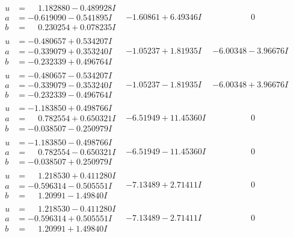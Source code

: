 \documentclass[1p]{elsarticle_modified}
\theoremstyle{definition}
\begin{document}
$$\begin{array}{c|c|c}
\begin{aligned}
u &= \phantom{-}1.182880 - 0.489928 I \\
a &= -0.619090 - 0.541895 I \\
b &= \phantom{-}0.230254 + 0.078235 I\end{aligned}
 & -1.60861 + 6.49346 I & \phantom{-0.000000 } 0 \\ \hline\begin{aligned}
u &= -0.480657 + 0.534207 I \\
a &= -0.339079 + 0.353240 I \\
b &= -0.232339 + 0.496764 I\end{aligned}
 & -1.05237 + 1.81935 I & -6.00348 - 3.96676 I \\ \hline\begin{aligned}
u &= -0.480657 - 0.534207 I \\
a &= -0.339079 - 0.353240 I \\
b &= -0.232339 - 0.496764 I\end{aligned}
 & -1.05237 - 1.81935 I & -6.00348 + 3.96676 I \\ \hline\begin{aligned}
u &= -1.183850 + 0.498766 I \\
a &= \phantom{-}0.782554 + 0.650321 I \\
b &= -0.038507 - 0.250979 I\end{aligned}
 & -6.51949 + 11.45360 I & \phantom{-0.000000 } 0 \\ \hline\begin{aligned}
u &= -1.183850 - 0.498766 I \\
a &= \phantom{-}0.782554 - 0.650321 I \\
b &= -0.038507 + 0.250979 I\end{aligned}
 & -6.51949 - 11.45360 I & \phantom{-0.000000 } 0 \\ \hline\begin{aligned}
u &= \phantom{-}1.218530 + 0.411280 I \\
a &= -0.596314 - 0.505551 I \\
b &= \phantom{-}1.20991 - 1.49840 I\end{aligned}
 & -7.13489 + 2.71411 I & \phantom{-0.000000 } 0 \\ \hline\begin{aligned}
u &= \phantom{-}1.218530 - 0.411280 I \\
a &= -0.596314 + 0.505551 I \\
b &= \phantom{-}1.20991 + 1.49840 I\end{aligned}
 & -7.13489 - 2.71411 I & \phantom{-0.000000 } 0\\

\end{array}$$
\end{document}

